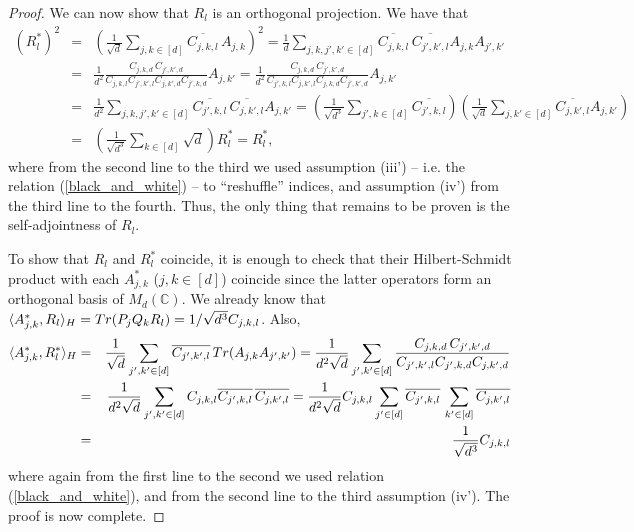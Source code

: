 \documentclass[10pt,a4paper]{amsart}
\newcommand{\CC}{\ensuremath{\mathbb{C}}}
\begin{document}
\begin{proof}
We can now show that $R_l$ is an orthogonal projection. We have that
\begin{eqnarray}
\nonumber
(R_l^*)^2 &=& \left(\frac{1}{\sqrt{d}}\sum_{j,k \in [d]}\overline{C_{j,k,l}}\, A_{j,k}\right)^2 = 
\frac{1}{d}
\sum_{j,k,j',k'\in [d]}
\overline{C_{j,k,l}}\,
\overline{C_{j',k',l}}
A_{j,k}A_{j',k'}
\\
\nonumber
&=&
\frac{1}{d^2}
\frac{C_{j,k,d} \, C_{j',k',d}}{ 
C_{j,k,l}
C_{j',k',l} C_{j,k',d} C_{j',k,d}}
A_{j,k'} = 
\frac{1}{d^2}
\frac{C_{j,k,d} \, C_{j',k',d}}{ 
C_{j',k,l}
C_{j,k',l} C_{j,k,d} C_{j',k',d}}
A_{j,k'}
\\
\nonumber
&=&
\frac{1}{d^2}
\sum_{j,k,j',k'\in [d]}
\overline{C_{j',k,l}}\,
\overline{C_{j,k',l}}
A_{j,k'} = 
\left(\frac{1}{\sqrt{d^3}}
\sum_{j',k\in [d]}
\overline{C_{j',k,l}} \right)
\left(\frac{1}{\sqrt{d}}
\sum_{j,k'\in [d]}
\overline{C_{j,k',l}}
A_{j,k'} \right)
\\
\nonumber
&=&
\left(\frac{1}{\sqrt{d^3}}
\sum_{k\in [d]}
\sqrt{d}
\right) R_l^*
=R_l^*,
\end{eqnarray}
where from the second line to the third we used assumption (iii') -- i.e. the relation (\ref{black_and_white}) -- to ``reshuffle'' indices, and assumption (iv') from the third line to the fourth. Thus, the only thing that remains to be proven is the self-adjointness
of $R_l$.

To show that $R_l$ and $R_l^*$
coincide, it is enough to check that their Hilbert-Schmidt product with each $A_{j,k}^*$ ($j,k\in [d]$) coincide since the latter operators form an orthogonal basis of $M_d(\CC)$. 
We already know that
$\langle A_{j,k}^*,R_l\rangle_{H} = {\rm Tr}(P_j Q_k R_l)=1/\sqrt{d^3} C_{j,k,l}$. Also,
\begin{eqnarray}
\nonumber
\langle A_{j,k}^*,R_l^*\rangle_{H} &=& \frac{1}{\sqrt{d}}
\sum_{j',k'\in [d]} \overline{C_{j',k',l}}\,
{\rm Tr}(A_{j,k} A_{j',k'})=
\frac{1}{d^2\sqrt{d}}
\sum_{j',k'\in [d]} 
\frac{C_{j,k,d}\, C_{j',k',d}}{ 
C_{j',k',l} C_{j',k,d} C_{j,k',d}}
\\
\nonumber
&=&
\frac{1}{d^2\sqrt{d}}
\sum_{j',k'\in [d]} 
C_{j,k,l}
\overline{C_{j',k,l}}\, \overline{C_{j,k',l}}
=\frac{1}{d^2\sqrt{d}}
C_{j,k,l}
\sum_{j'\in [d]} 
\overline{C_{j',k,l}}\, 
\sum_{k'\in [d]} 
\overline{C_{j,k',l}}
\\
\nonumber
&=&
\frac{1}{\sqrt{d^3}}
C_{j,k,l}
\end{eqnarray}
where again from the first line to the second we used relation
(\ref{black_and_white}), and from 
the second line to the third assumption (iv'). The proof is now complete. 
\end{proof}
\end{document}
